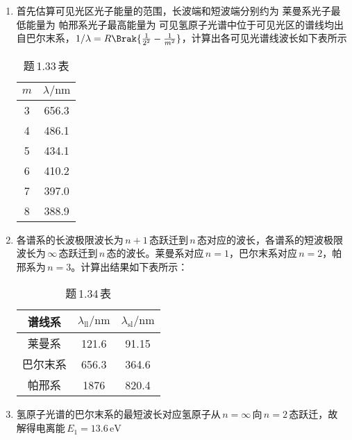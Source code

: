 \begin{enumerate}[label=1.\arabic*]
\item
首先估算可见光区光子能量的范围，长波端和短波端分别约为
莱曼系光子最低能量为
帕邢系光子最高能量为
可见氢原子光谱中位于可见光区的谱线均出自巴尔末系，$1/\lambda=R\Brak{\frac{1}{2^2}-\frac{1}{m^2}}$，计算出各可见光谱线波长如下表所示
\begin{table}[h]
    \centering
    \begin{tabular}{c|c}
    \hline
        \rule{0pt}{13pt}$m$ & $\lambda/\mathrm{nm}$\\
        \hline
        \rule{0pt}{13pt}3 & 656.3 \\
        \rule{0pt}{13pt}4 & 486.1 \\
        \rule{0pt}{13pt}5 & 434.1 \\
        \rule{0pt}{13pt}6 & 410.2 \\
        \rule{0pt}{13pt}7 & 397.0 \\
        \rule{0pt}{13pt}8 & 388.9 \\
    \hline
    \end{tabular}
    \caption{题\,1.33\,表}
\end{table}

\item
各谱系的长波极限波长为$\,n+1\,$态跃迁到$\,n\,$态对应的波长，各谱系的短波极限波长为$\,\infty\,$态跃迁到$\,n\,$态的波长。莱曼系对应$\,n=1$，巴尔末系对应$\,n=2$，帕邢系为$\,n=3$。计算出结果如下表所示：
\begin{table}[h]
    \centering
    \begin{tabular}{c|c|c}
    \hline
        \rule{0pt}{13pt}谱线系 & $\lambda_\mathrm{ll}/\mathrm{nm}$ & $\lambda_\mathrm{sl}/\mathrm{nm}$ \\
        \hline
        \rule{0pt}{13pt}莱曼系 & 121.6 & 91.15 \\
        \rule{0pt}{13pt}巴尔末系 & 656.3 & 364.6 \\
        \rule{0pt}{13pt}帕邢系 & 1876 & 820.4 \\
    \hline
    \end{tabular}
    \caption{题\,1.34\,表}
\end{table}

\item
氢原子光谱的巴尔末系的最短波长对应氢原子从$\,n=\infty\,$向$\,n=2\,$态跃迁，故
解得电离能$\,E_1=13.6\,\mathrm{eV}$


\end{enumerate}
